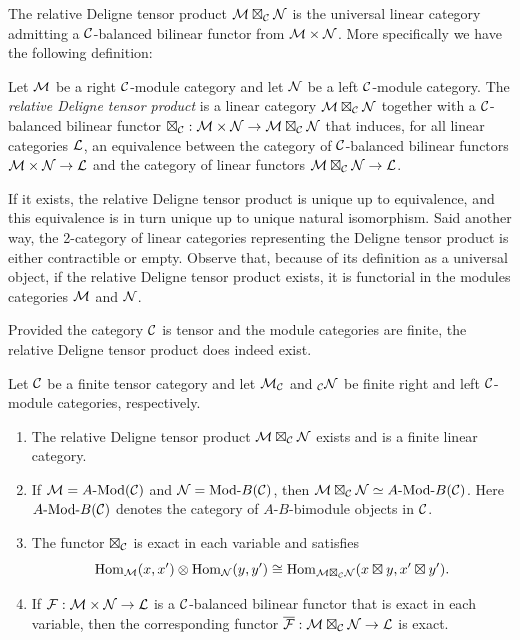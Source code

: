 \documentclass{amsart}
\begin{document}
The relative Deligne tensor product $\mathcal M \boxtimes_{\mathcal C} \mathcal N$ is the universal linear category admitting a $\mathcal C$-balanced bilinear functor from $\mathcal M \times \mathcal N$.  More specifically we have the following definition:

\begin{definition}
	Let $\mathcal M$ be a right $\mathcal C$-module category and let $\mathcal N$ be a left $\mathcal C$-module category.  The {\em relative Deligne tensor product} is a linear category $\mathcal M \boxtimes_{\mathcal C} \mathcal N$ together with a $\mathcal C$-balanced bilinear functor $\boxtimes_{\mathcal C}: \mathcal M \times \mathcal N \to \mathcal M \boxtimes_{\mathcal C} \mathcal N$ that induces, for all linear categories $\mathcal L$, an equivalence between the category of $\mathcal C$-balanced bilinear functors $\mathcal M \times \mathcal N \to \mathcal L$ and the category of linear functors $\mathcal M \boxtimes_{\mathcal C} \mathcal N \to \mathcal L$. 
\end{definition}

\noindent If it exists, the relative Deligne tensor product is unique up to equivalence, and this equivalence is in turn unique up to unique natural isomorphism. Said another way, the 2-category of linear categories representing the Deligne tensor product is either contractible or empty.  Observe that, because of its definition as a universal object, if the relative Deligne tensor product exists, it is functorial in the modules categories $\mathcal M$ and $\mathcal N$.

Provided the category $\mathcal C$ is tensor and the module categories are finite, the relative Deligne tensor product does indeed exist.

\begin{theorem} \label{thm:DelignePrdtOverATCExists}
	Let $\mathcal C$ be a finite tensor category and let $\mathcal M_{\mathcal C}$ and ${}_{\mathcal C}\mathcal N$ be finite right and left $\mathcal C$-module categories, respectively. 
	\begin{enumerate}
		\item The relative Deligne tensor product $\mathcal M \boxtimes_{\mathcal C} \mathcal N$ exists and is a finite linear category.
		\item If $\cM = \Mod{A}{}(\cC)$ and $\cN = \Mod{}{B}(\cC)$, then $\cM \boxtimes_{\cC} \cN \simeq \Mod{A }{B}(\cC)$. Here $\Mod{A}{B}(\cC)$ denotes the category of $A$-$B$-bimodule objects in $\mathcal C$.

		\item The functor $\boxtimes_{\mathcal C}$ is exact in each variable and satisfies 
		\begin{equation*}
			\operatorname{Hom}_{\mathcal M}(x,x') \otimes \operatorname{Hom}_{\mathcal N}(y, y') \cong \operatorname{Hom}_{\mathcal M \boxtimes_{\mathcal C} \mathcal N} (x \boxtimes y, x' \boxtimes y').
		\end{equation*}
		\item If $\mathcal F: \mathcal M \times \mathcal N \to \mathcal L$ is a $\mathcal C$-balanced bilinear functor that is exact in each variable, then the corresponding functor $\overline{\mathcal F}: \mathcal M \boxtimes_{\mathcal C} \mathcal N \to \mathcal L$ is exact. 
	\end{enumerate} 	
\end{theorem}
\end{document}
